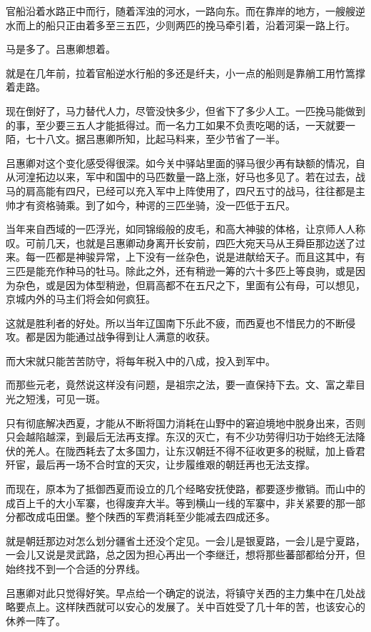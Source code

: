 官船沿着水路正中而行，随着浑浊的河水，一路向东。而在靠岸的地方，一艘艘逆水而上的船只正由着多至三五匹，少则两匹的挽马牵引着，沿着河渠一路上行。

马是多了。吕惠卿想着。

就是在几年前，拉着官船逆水行船的多还是纤夫，小一点的船则是靠艄工用竹篙撑着走路。

现在倒好了，马力替代人力，尽管没快多少，但省下了多少人工。一匹挽马能做到的事，至少要三五人才能抵得过。而一名力工如果不负责吃喝的话，一天就要一陌，七十八文。据吕惠卿所知，比起马料来，至少节省了一半。

吕惠卿对这个变化感受得很深。如今关中驿站里面的驿马很少再有缺额的情况，自从河湟拓边以来，军中和国中的马匹数量一路上涨，好马也多见了。若在过去，战马的肩高能有四尺，已经可以充入军中上阵使用了，四尺五寸的战马，往往都是主帅才有资格骑乘。到了如今，种谔的三匹坐骑，没一匹低于五尺。

当年来自西域的一匹浮光，如同锦缎般的皮毛，和高大神骏的体格，让京师人人称叹。可前几天，也就是吕惠卿动身离开长安前，四匹大宛天马从王舜臣那边送了过来。每一匹都是神骏异常，上下没有一丝杂色，说是进献给天子。而且这其中，有三匹是能充作种马的牡马。除此之外，还有稍逊一筹的六十多匹上等良驹，或是因为杂色，或是因为体型稍逊，但肩高都不在五尺之下，里面有公有母，可以想见，京城内外的马主们将会如何疯狂。

这就是胜利者的好处。所以当年辽国南下乐此不疲，而西夏也不惜民力的不断侵攻。都是因为能通过战争得到让人满意的收获。

而大宋就只能苦苦防守，将每年税入中的八成，投入到军中。

而那些元老，竟然说这样没有问题，是祖宗之法，要一直保持下去。文、富之辈目光之短浅，可见一斑。

只有彻底解决西夏，才能从不断将国力消耗在山野中的窘迫境地中脱身出来，否则只会越陷越深，到最后无法再支撑。东汉的灭亡，有不少功劳得归功于始终无法降伏的羌人。在陇西耗去了太多国力，让东汉朝廷不得不征收更多的税赋，加上昏君歼宦，最后再一场不合时宜的天灾，让步履维艰的朝廷再也无法支撑。

而现在，原本为了抵御西夏而设立的几个经略安抚使路，都要逐步撤销。而山中的成百上千的大小军寨，也得废弃大半。等到横山一线的军寨中，非关紧要的那一部分都改成屯田堡。整个陕西的军费消耗至少能减去四成还多。

就是朝廷那边对怎么划分疆省土还没个定见。一会儿是银夏路，一会儿是宁夏路，一会儿又说是灵武路，总之因为担心再出一个李继迁，想将那些蕃部都给分开，但始终找不到一个合适的分界线。

吕惠卿对此只觉得好笑。早点给一个确定的说法，将镇守关西的主力集中在几处战略要点上。这样陕西就可以安心的发展了。关中百姓受了几十年的苦，也该安心的休养一阵了。

